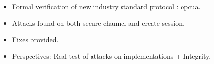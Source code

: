 \begin{itemize}
    \item Formal verification of new industry standard protocol : opcua.
    \item Attacks found on both secure channel and create session.
    \item Fixes provided.
    \item Perspectives: Real test of attacks on implementations + Integrity.
\end{itemize}
